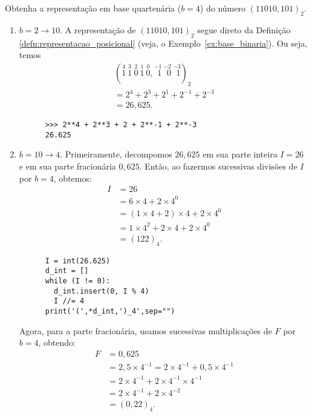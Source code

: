 \begin{ex}
  Obtenha a representação em base quartenária ($b=4$) do número $(11010,101)_2$.
  \begin{enumerate}[1.]
  \item $b=2 \to 10$. 
    A representação de $(11010,101)_2$ segue direto da Definição \ref{defn:representacao_posicional} (veja, o Exemplo~\ref{ex:base_binaria}). Ou seja, temos
    \begin{gather}
      (\stackrel{4}{1}~\stackrel{3}{1}~\stackrel{2}{0}~\stackrel{1}{1}~\stackrel{0}{0},\stackrel{-1}{~\,1}~\stackrel{-2}{~\,0}~\stackrel{-3}{~\,1})_2 \\
      = 2^4 + 2^3 + 2^1 + 2^{-1} + 2^{-3} \\
      = 26,625.
    \end{gather}
    \ifispython
    \begin{lstlisting}
      >>> 2**4 + 2**3 + 2 + 2**-1 + 2**-3
      26.625
    \end{lstlisting}
    \fi

  \item $b=10 \to 4$.
    Primeiramente, decompomos $26,625$ em sua parte inteira $I = 26$ e em sua parte fracionária $0,625$. Então, ao fazermos sucessivas divisões de $I$ por $b=4$, obtemos:
    \begin{align}
      I &= 26\\
        &= 6\times 4 + 2\times 4^0\\
        &= (1\times 4 + 2)\times 4 + 2\times 4^0\\
        &= 1\times 4^2 + 2\times 4 + 2\times 4^0\\
        &= (122)_4.
    \end{align}

    \ifispython
    \begin{lstlisting}
      I = int(26.625)
      d_int = []
      while (I != 0):
        d_int.insert(0, I % 4)
        I //= 4
      print('(',*d_int,')_4',sep="")
    \end{lstlisting}
    \fi
    
    Agora, para a parte fracionária, usamos sucessivas multiplicações de $F$ por $b=4$, obtendo:
    \begin{align}
      F &= 0,625\\
        &= 2,5\times 4^{-1} = 2\times 4^{-1} + 0,5\times 4^{-1}\\
        &= 2\times 4^{-1} + 2\times 4^{-1}\times 4^{-1}\\
        &= 2\times 4^{-1} + 2\times 4^{-2}\\
        &= (0,22)_{4}.
    \end{align}


\end{enumerate}
\end{ex}
